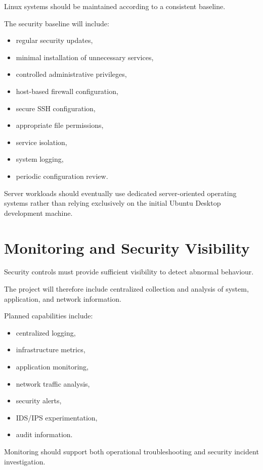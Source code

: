 Linux systems should be maintained according to a consistent baseline.

The security baseline will include:

\begin{itemize}
    \item regular security updates,
    \item minimal installation of unnecessary services,
    \item controlled administrative privileges,
    \item host-based firewall configuration,
    \item secure SSH configuration,
    \item appropriate file permissions,
    \item service isolation,
    \item system logging,
    \item periodic configuration review.
\end{itemize}

Server workloads should eventually use dedicated server-oriented operating
systems rather than relying exclusively on the initial Ubuntu Desktop
development machine.


\section{Monitoring and Security Visibility}

Security controls must provide sufficient visibility to detect abnormal
behaviour.

The project will therefore include centralized collection and analysis of
system, application, and network information.

Planned capabilities include:

\begin{itemize}
    \item centralized logging,
    \item infrastructure metrics,
    \item application monitoring,
    \item network traffic analysis,
    \item security alerts,
    \item IDS/IPS experimentation,
    \item audit information.
\end{itemize}

Monitoring should support both operational troubleshooting and security
incident investigation.

